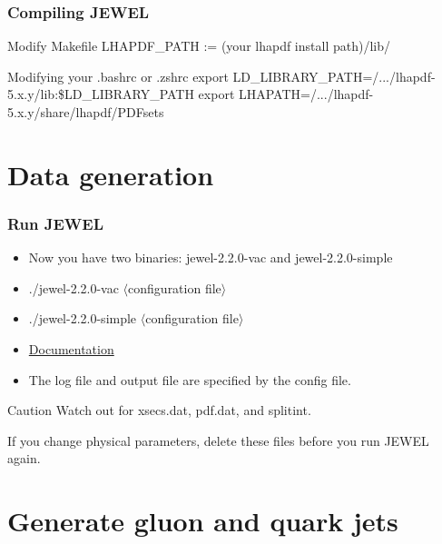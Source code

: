 \documentclass{beamer}
\begin{document}
\begin{frame}
 \frametitle{Compiling JEWEL}
 \begin{block}{Modify Makefile}
 LHAPDF\_PATH := (your lhapdf install path)/lib/
 \end{block}

 \begin{exampleblock}{Modifying your .bashrc or .zshrc}
 export LD\_LIBRARY\_PATH=/.../lhapdf-5.x.y/lib:\$LD\_LIBRARY\_PATH
 export LHAPATH=/.../lhapdf-5.x.y/share/lhapdf/PDFsets
 \end{exampleblock}
\end{frame}


\section{Data generation}
\begin{frame}
\frametitle{Run JEWEL}
\begin{itemize}
 \item Now you have two binaries: jewel-2.2.0-vac and jewel-2.2.0-simple
 \item ./jewel-2.2.0-vac $\langle$configuration file$\rangle$
 \item ./jewel-2.2.0-simple $\langle$configuration file$\rangle$
 \item \href{https://arxiv.org/pdf/1311.0048.pdf}{Documentation}
 \item The log file and output file are specified by the config file.
\end{itemize}

\begin{alertblock}{Caution}
Watch out for xsecs.dat, pdf.dat, and splitint.

If you change physical parameters, delete these files before you run JEWEL again.
\end{alertblock}



\end{frame}

\section{Generate gluon and quark jets}
\end{document}

